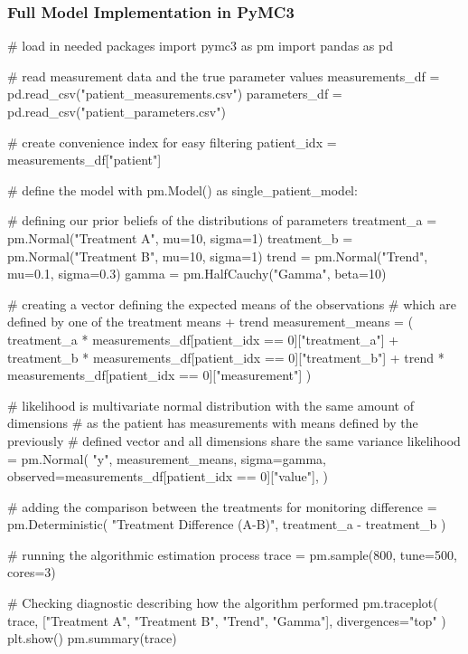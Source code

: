 \documentclass[12pt,a4paper,leqno]{report}
\theoremstyle{plain}
\theoremstyle{definition}
\theoremstyle{remark}
\begin{document}
\pagebreak

\subsubsection*{Full Model Implementation in PyMC3}
\bigskip

\begin{pyverbatim}[][fontsize=\footnotesize]
# load in needed packages
import pymc3 as pm
import pandas as pd

# read measurement data and the true parameter values
measurements_df = pd.read_csv("patient_measurements.csv")
parameters_df = pd.read_csv("patient_parameters.csv")

# create convenience index for easy filtering
patient_idx = measurements_df["patient"]
   
# define the model
with pm.Model() as single_patient_model:

    # defining our prior beliefs of the distributions of parameters
    treatment_a = pm.Normal("Treatment A", mu=10, sigma=1)
    treatment_b = pm.Normal("Treatment B", mu=10, sigma=1)
    trend = pm.Normal("Trend", mu=0.1, sigma=0.3)
    gamma = pm.HalfCauchy("Gamma", beta=10)

    # creating a vector defining the expected means of the observations
    # which are defined by one of the treatment means + trend
    measurement_means = (
        treatment_a * measurements_df[patient_idx == 0]["treatment_a"]
        + treatment_b * measurements_df[patient_idx == 0]["treatment_b"]
        + trend * measurements_df[patient_idx == 0]["measurement"]
    )

    # likelihood is multivariate normal distribution with the same amount of dimensions
    # as the patient has measurements with means defined by the previously
    # defined vector and all dimensions share the same variance
    likelihood = pm.Normal(
        "y",
        measurement_means,
        sigma=gamma,
        observed=measurements_df[patient_idx == 0]["value"],
    )

    # adding the comparison between the treatments for monitoring
    difference = pm.Deterministic(
        "Treatment Difference (A-B)", treatment_a - treatment_b
    )

    # running the algorithmic estimation process
    trace = pm.sample(800, tune=500, cores=3)

    # Checking diagnostic describing how the algorithm performed
    pm.traceplot(
        trace, ["Treatment A", "Treatment B", "Trend", "Gamma"], divergences="top"
    )
    plt.show()
    pm.summary(trace)


\end{pyverbatim}
\end{document}
